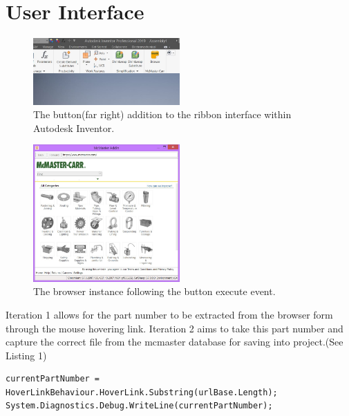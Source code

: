 \documentclass[12pt, letterpaper]{article}
\begin{document}
\section{User Interface}
\begin{figure}[H]
    \centering
    \includegraphics[width=0.5\textwidth]{Figures/mcMasterButton.JPG}
    \caption{The button(far right) addition to the ribbon interface within Autodesk Inventor.}
\end{figure}
\begin{figure}[H]
    \centering
    \includegraphics[width=0.5\textwidth]{Figures/webBrowserView.jpg}
    \caption{The browser instance following the button execute event.}
\end{figure}

Iteration 1 allows for the part number to be extracted from the browser form through the mouse hovering link. Iteration 2 aims to take this part number and capture the correct file from the mcmaster database for saving into project.(See Listing 1)\\
\begin{lstlisting}
currentPartNumber = HoverLinkBehaviour.HoverLink.Substring(urlBase.Length);
System.Diagnostics.Debug.WriteLine(currentPartNumber);
\end{lstlisting}

\newpage
\end{document}
